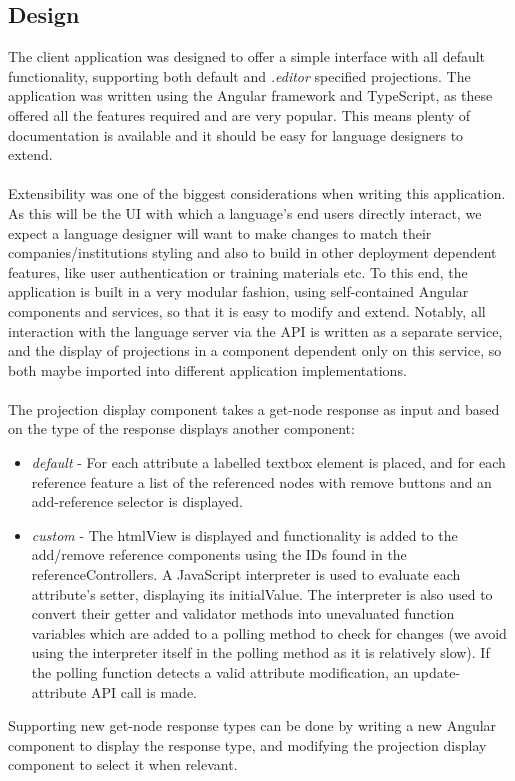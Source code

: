 \documentclass{article}
\begin{document}
{\subsection{Design}
The client application was designed to offer a simple interface with all default functionality, supporting both default and \emph{.editor} specified projections. The application was written using the Angular framework and TypeScript, as these offered all the features required and are very popular. This means plenty of documentation is available and it should be easy for language designers to extend.
\\
\\
Extensibility was one of the biggest considerations when writing this application. As this will be the UI with which a language's end users directly interact, we expect a language designer will want to make changes to match their companies/institutions styling and also to build in other deployment dependent features, like user authentication or training materials etc. To this end, the application is built in a very modular fashion, using self-contained Angular components and services, so that it is easy to modify and extend. Notably, all interaction with the language server via the API is written as a separate service, and the display of projections in a component dependent only on this service, so both maybe imported into different application implementations. 
\\
\\
The projection display component takes a get-node response as input and based on the type of the response displays another component:
\begin{itemize}
\item \emph{default} - For each attribute a labelled textbox element is placed, and for each reference feature a list of the referenced nodes with remove buttons and an add-reference selector is displayed.
\item \emph{custom} - The htmlView is displayed and functionality is added to the add/remove reference components using the IDs found in the referenceControllers. A JavaScript interpreter is used to evaluate each attribute's setter, displaying its initialValue. The interpreter is also used to convert their getter and validator methods into unevaluated function variables which are added to a polling method to check for changes (we avoid using the interpreter itself in the polling method as it is relatively slow). If the polling function detects a valid attribute modification, an update-attribute API call is made.
\end{itemize}
Supporting new get-node response types can be done by writing a new Angular component to display the response type, and modifying the projection display component to select it when relevant.
}
\end{document}
